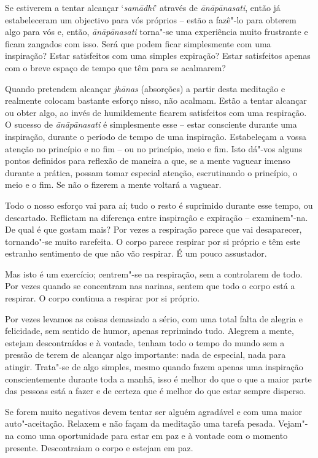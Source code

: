 Se estiverem a tentar alcançar `\emph{samādhi}' através de
\emph{ānāpānasati}, então já estabeleceram um objectivo para vós
próprios  -- estão a fazê"-lo para obterem algo para vós e, então,
\emph{ānāpānasati} torna"-se uma experiência muito frustrante e ficam 
zangados com isso. Será que podem ficar simplesmente com uma inspiração? 
Estar satisfeitos com uma simples expiração? Estar satisfeitos apenas
com o breve espaço de tempo que têm para se acalmarem?

Quando pretendem alcançar \emph{jhānas} (absorções) a partir desta
meditação e realmente colocam bastante esforço nisso, não acalmam. Estão
a tentar alcançar ou obter algo, ao invés de humildemente ficarem
satisfeitos com uma respiração. O sucesso de \emph{ānāpānasati} é
simplesmente esse -- estar consciente durante uma inspiração, durante o
período de tempo de uma inspiração. Estabeleçam a vossa atenção no
princípio e no fim -- ou no princípio, meio e fim. Isto dá"-vos alguns
pontos definidos para reflexão de maneira a que, se a mente vaguear
imenso durante a prática, possam tomar especial atenção, escrutinando o
princípio, o meio e o fim. Se não o fizerem a mente voltará a vaguear.

Todo o nosso esforço vai para aí; tudo o resto é suprimido durante esse
tempo, ou descartado. Reflictam na diferença entre inspiração e
expiração -- examinem"-na. De qual é que gostam mais? Por vezes a
respiração parece que vai desaparecer, tornando"-se muito rarefeita. O
corpo parece respirar por si próprio e têm este estranho sentimento de
que não vão respirar. É um pouco assustador.

Mas isto é um exercício; centrem"-se na respiração, sem a controlarem de
todo. Por vezes quando se concentram nas narinas, sentem que todo o
corpo está a respirar. O corpo continua a respirar por si próprio.

Por vezes levamos as coisas demasiado a sério, com uma total falta de
alegria e felicidade, sem sentido de humor, apenas
reprimindo tudo. Alegrem a mente, estejam descontraídos e à
vontade, tenham todo o tempo do mundo sem a pressão de terem de alcançar
algo importante: nada de especial, nada para atingir. Trata"-se de algo
simples, mesmo quando fazem apenas uma inspiração conscientemente
durante toda a manhã, isso é melhor do que o que a maior parte das pessoas
está a fazer e de certeza que é melhor do que estar sempre disperso.

Se forem muito negativos devem tentar ser alguém agradável e com uma
maior auto"-aceitação. Relaxem e não façam da meditação uma tarefa
pesada. Vejam"-na como uma oportunidade para estar em paz e à vontade com
o momento presente. Descontraiam o corpo e estejam em paz.

